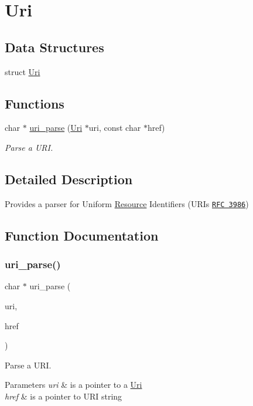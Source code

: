 \hypertarget{group__uri}{}\section{Uri}
\label{group__uri}
\subsection*{Data Structures}
\begin{DoxyCompactItemize}
\item 
struct \hyperlink{structUri}{Uri}
\end{DoxyCompactItemize}
\subsection*{Functions}
\begin{DoxyCompactItemize}
\item 
char $\ast$ \hyperlink{group__uri_ga6bc8450276986e96584800777d6122f6}{uri\+\_\+parse} (\hyperlink{structUri}{Uri} $\ast$uri, const char $\ast$href)
\begin{DoxyCompactList}\small\item\em Parse a U\+RI. \end{DoxyCompactList}\end{DoxyCompactItemize}


\subsection{Detailed Description}
Provides a parser for Uniform \hyperlink{structResource}{Resource} Identifiers (U\+R\+Is \href{https://www.ietf.org/rfc/rfc3986.txt}{\tt R\+FC 3986}) 

\subsection{Function Documentation}
\mbox{\label{group__uri_ga6bc8450276986e96584800777d6122f6}} 
\subsubsection{\texorpdfstring{uri\+\_\+parse()}{uri\_parse()}}
{\footnotesize\ttfamily char $\ast$ uri\+\_\+parse (\begin{DoxyParamCaption}\item[{\hyperlink{structUri}{Uri} $\ast$}]{uri,  }\item[{const char $\ast$}]{href }\end{DoxyParamCaption})}



Parse a U\+RI. 


\begin{DoxyParams}{Parameters}
{\em uri} & is a pointer to a \hyperlink{structUri}{Uri} \\
\hline
{\em href} & is a pointer to U\+RI string \\
\hline
\end{DoxyParams}
